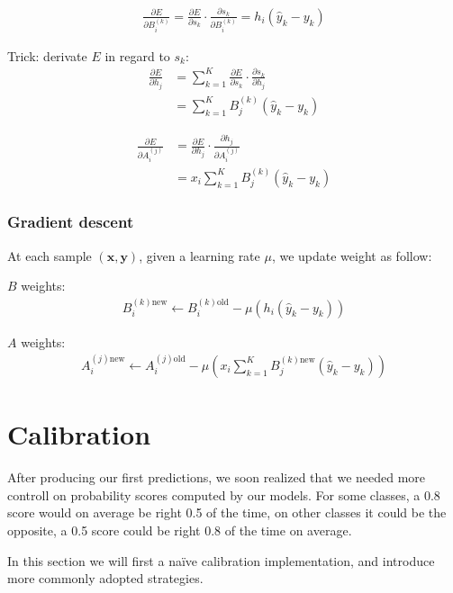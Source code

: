 \begin{align}
	\frac{\partial E}{\partial B_i^{(k)}} 
	= 
	\frac{\partial E}{\partial s_k} \cdot \frac{\partial s_k}{\partial B_i^{(k)}} 
	= 
	h_i (\hat y_k - y_k)
\end{align}


Trick: derivate $E$ in regard to $s_k$:
\begin{align}
	\frac{\partial E}{\partial h_j} 
	&= 
	\sum_{k=1}^K \frac{\partial E}{\partial s_k} \cdot \frac{\partial s_k}{\partial h_j} \\
	&= 
	\sum_{k=1}^K B_j^{(k)} (\hat y_k - y_k)
\end{align}


\begin{align}
	\frac{\partial E}{\partial A_i^{(j)}} 
	&= 
	\frac{\partial E}{\partial h_j} \cdot \frac{\partial h_j}{\partial A_i^{(j)}} \\
	&= 
	x_i \sum_{k=1}^K B_j^{(k)} (\hat y_k - y_k)
\end{align}


\subsubsection*{Gradient descent}

At each sample $(\mathbf{x}, \mathbf{y})$, given a learning rate $\mu$, we update weight as follow:

$B$ weights:
\begin{align}
	B_i^{(k)\mbox{new}} \leftarrow B_i^{(k)\mbox{old}} - \mu (h_i (\hat y_k - y_k))
\end{align}

$A$ weights:
\begin{align}
	A_i^{(j)\mbox{new}} \leftarrow A_i^{(j)\mbox{old}} - 
	\mu 
	\left(
		x_i \sum_{k=1}^K B_j^{(k)\mbox{new}} (\hat y_k - y_k) 
	\right)
\end{align}



\pagebreak
\section{Calibration}

After producing our first predictions, we soon realized that we needed more controll on probability scores computed by our models. For some classes, a 0.8 score would on average be right 0.5 of the time, on other classes it could be the opposite, a 0.5 score could be right 0.8 of the time on average.

In this section we will first a naïve calibration implementation, and introduce more commonly adopted strategies.

